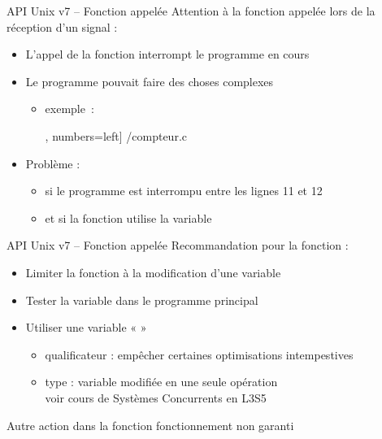\begin {frame} {API Unix v7 -- Fonction appelée}
    Attention à la fonction appelée lors de la réception d'un signal :

    \begin {itemize}
	\item L'appel de la fonction interrompt le programme en
	    cours
	\item Le programme pouvait faire des choses complexes

	    \begin {itemize}
		\item exemple~:

		    \fE\lstmonstyle, numbers=left] {\inc/compteur.c}
	    \end {itemize}

	\item Problème :
	    \begin {itemize}
		\item si le programme est interrompu entre les lignes 11 et 12
		\item et si la fonction utilise la variable 
	    \end {itemize}
    \end {itemize}
\end {frame}

\begin {frame} {API Unix v7 -- Fonction appelée}
    Recommandation pour la fonction :

    \begin {itemize}
	\item Limiter la fonction à la modification d'une variable
	\item Tester la variable dans le programme principal
	\item Utiliser une variable «  »
	    \begin {itemize}
		\item qualificateur  : empêcher
		    certaines optimisations intempestives
		\item type  : variable modifiée
		    en une seule opération
		    \\
		    \implique voir cours de Systèmes Concurrents en L3S5
	    \end {itemize}
    \end {itemize}

    \vspace* {3mm}

    Autre action dans la fonction \implique fonctionnement
    non garanti
\end {frame}

